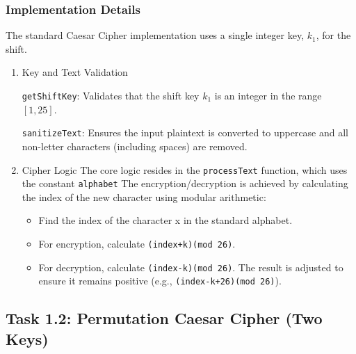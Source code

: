 \documentclass[a4paper,12pt]{article}
\begin{document}
\subsubsection{Implementation Details}
\label{sec:org702c33d}
The standard Caesar Cipher implementation uses a single integer key, \(k_{1}\), for the shift.
\begin{enumerate}
\item Key and Text Validation
\label{sec:org536bd7f}

\texttt{getShiftKey}: Validates that the shift key \(k_{1}\) is an integer in the range \([1,25]\).

\texttt{sanitizeText}: Ensures the input plaintext is converted to uppercase and all non-letter characters (including spaces) are removed.
\item Cipher Logic
\label{sec:orgdf83abf}
The core logic resides in the \texttt{processText} function, which uses the constant \texttt{alphabet}
The encryption/decryption is achieved by calculating the index of the new character using modular arithmetic:
\begin{itemize}
\item Find the index of the character x in the standard alphabet.
\item For encryption, calculate \texttt{(index+k)(mod 26)}.
\item For decryption, calculate \texttt{(index-k)(mod 26)}. The result is adjusted to ensure it remains positive (e.g., \texttt{(index-k+26)(mod 26)}).
\end{itemize}
\end{enumerate}
\subsection{Task 1.2: Permutation Caesar Cipher (Two Keys)}
\label{sec:orgf5a0cc6}
\end{document}
